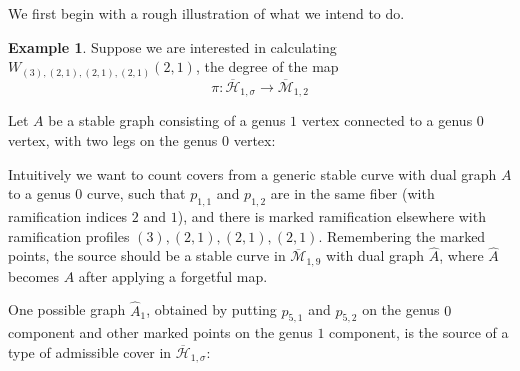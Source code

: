 \documentclass[thesis]{thesis-umich}           %
\newcommand{\mb}{\overline{\mathcal M}}
\newcommand{\Hb}{\overline{\mathcal H}}
\theoremstyle{definition}
\newtheorem{eg}[thm]{Example}
\begin{document}
We first begin with a rough illustration of what we intend to do.

\begin{eg}
  \label{eg:fourtorsion}
  Suppose we are interested in calculating $W_{(3),(2,1),(2,1),(2,1)}(2,1)$, the degree of the map
  \[
  \pi:\Hb_{1,\sigma}\to\mb_{1,2}
  \]
  
  Let $A$ be a stable graph consisting of a genus $1$ vertex connected to a genus $0$ vertex, with two legs on the
  genus $0$ vertex:

  

  Intuitively we want to count covers from a generic stable curve with dual graph $A$ to a genus $0$
  curve, such that $p_{1,1}$ and $p_{1,2}$ are in the same fiber (with ramification indices $2$ and $1$),
  and there is marked ramification elsewhere with ramification profiles $(3),(2,1),(2,1),(2,1)$.
  Remembering the marked points, the source should be a stable curve in $\mb_{1,9}$ with dual graph $\hat A$, where $\hat A$
  becomes $A$ after applying a forgetful map.

  One possible graph $\hat A_1$, obtained by putting $p_{5,1}$ and $p_{5,2}$ on the genus $0$ component and other
  marked points on the genus $1$ component, is the source of a type of admissible cover in $\Hb_{1,\sigma}$:

                  \begin{tikzpicture}[thick,amat/.style={matrix of nodes,nodes in empty cells,
  row sep=2.5em,rounded corners,
  nodes={draw,solid,circle,minimum size=1.0cm}},
  dmat/.style={matrix of nodes,nodes in empty cells,row sep=2.5em,nodes={minimum size=1.0cm},draw=myred},
  fsnode/.style={fill=myblue},
  ssnode/.style={fill=mygreen}]


\end{tikzpicture}
\end{eg}
\end{document}
